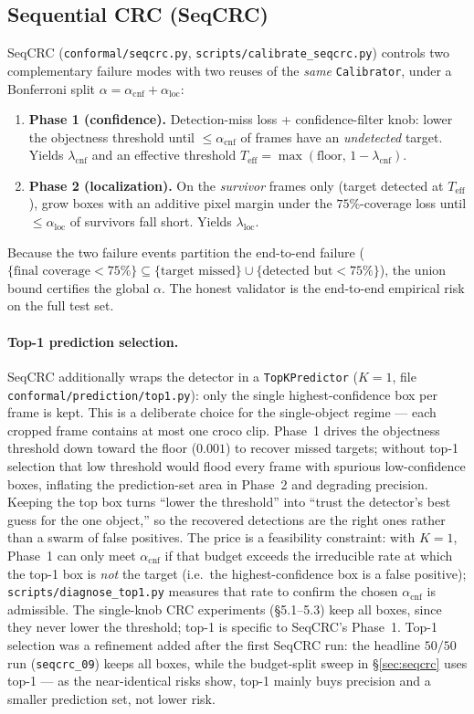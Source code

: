\documentclass[11pt,a4paper]{article}
\newcommand{\code}[1]{\texttt{\small #1}}
\begin{document}
\subsection{Sequential CRC (SeqCRC)}
SeqCRC (\code{conformal/seqcrc.py}, \code{scripts/calibrate\_seqcrc.py})
controls two complementary failure modes with two reuses of the \emph{same}
\code{Calibrator}, under a Bonferroni split $\alpha = \alpha_{\text{cnf}} +
\alpha_{\text{loc}}$:
\begin{enumerate}[leftmargin=1.6cm]
  \item \textbf{Phase 1 (confidence).} Detection-miss loss + confidence-filter
    knob: lower the objectness threshold until $\le\alpha_{\text{cnf}}$ of
    frames have an \emph{undetected} target. Yields $\lambda_{\text{cnf}}$ and
    an effective threshold $T_{\text{eff}} = \max(\text{floor},\,1-\lambda_{\text{cnf}})$.
  \item \textbf{Phase 2 (localization).} On the \emph{survivor} frames only
    (target detected at $T_{\text{eff}}$), grow boxes with an additive pixel
    margin under the $75\%$-coverage loss until $\le\alpha_{\text{loc}}$ of
    survivors fall short. Yields $\lambda_{\text{loc}}$.
\end{enumerate}
Because the two failure events partition the end-to-end failure
($\{\text{final coverage}<75\%\}\subseteq\{\text{target missed}\}\cup\{\text{detected but}<75\%\}$),
the union bound certifies the global $\alpha$. The honest validator is the
end-to-end empirical risk on the full test set.

\paragraph{Top-1 prediction selection.} SeqCRC additionally wraps the detector in
a \code{TopKPredictor} ($K=1$, file \code{conformal/prediction/top1.py}): only the
single highest-confidence box per frame is kept. This is a deliberate choice for
the single-object regime --- each cropped frame contains at most one croco clip.
Phase~1 drives the objectness threshold down toward the floor ($0.001$) to recover
missed targets; without top-1 selection that low threshold would flood every frame
with spurious low-confidence boxes, inflating the prediction-set area in Phase~2
and degrading precision. Keeping the top box turns ``lower the threshold'' into
``trust the detector's best guess for the one object,'' so the recovered detections
are the right ones rather than a swarm of false positives. The price is a feasibility
constraint: with $K=1$, Phase~1 can only meet $\alpha_{\text{cnf}}$ if that budget
exceeds the irreducible rate at which the top-1 box is \emph{not} the target (i.e.\
the highest-confidence box is a false positive); \code{scripts/diagnose\_top1.py}
measures that rate to confirm the chosen $\alpha_{\text{cnf}}$ is admissible. The
single-knob CRC experiments (\S5.1--5.3) keep all boxes, since they never lower the
threshold; top-1 is specific to SeqCRC's Phase~1. Top-1 selection was a refinement
added after the first SeqCRC run: the headline $50/50$ run (\code{seqcrc\_09}) keeps
all boxes, while the budget-split sweep in \S\ref{sec:seqcrc} uses top-1 --- as the
near-identical risks show, top-1 mainly buys precision and a smaller prediction set,
not lower risk.
\end{document}
